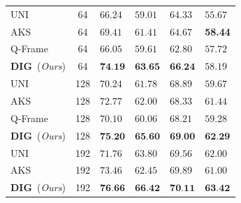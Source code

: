 \begin{table}[t]
\begin{minipage}{0.48\linewidth}
{\begin{tabular}{l|c|ZZZZ}
         UNI & 64 & $66.24$ & $59.01$ & $64.33$ & $55.67$ \\
         AKS~\cite{tang2025adaptivekeyframesamplinglong} & 64 & $69.41$ & $61.41$ & $64.67$ & \textbf{58.44} \\
         Q-Frame~\cite{zhang2025qframequeryawareframeselection} & 64 & $66.05$ & $59.61$ & $62.80$ & $57.72$ \\
         \textbf{DIG}~(\textit{Ours}) & 64 & $\textbf{74.19}$ & $\textbf{63.65}$ & $\textbf{66.24}$ & $58.19$ \\
         \midrule
         UNI & 128 & $70.24$ & $61.78$ & $68.89$ & $59.67$ \\
         AKS~\cite{tang2025adaptivekeyframesamplinglong} & 128 & $72.77$ & $62.00$ & $68.33$ & $61.44$ \\
         Q-Frame~\cite{zhang2025qframequeryawareframeselection} & 128 & $70.10$ & $60.06$ & $68.21$ & $59.28$ \\
         \textbf{DIG}~(\textit{Ours}) & 128 & $\textbf{75.20}$ & $\textbf{65.60}$ & $\textbf{69.00}$ & $\textbf{62.29}$ \\
         \midrule
         UNI & 192 & $71.76$ & $63.80$ & $69.56$ & $62.00$ \\
         AKS~\cite{tang2025adaptivekeyframesamplinglong} & 192 & $73.46$ & $62.45$ & $69.89$ & $61.00$ \\
         \textbf{DIG}~(\textit{Ours}) & 192 & $\textbf{76.66}$ & $\textbf{66.42}$ & $\textbf{70.11}$ & $\textbf{63.42}$ \\
         \bottomrule
      \end{tabular}
    }
  \end{minipage}
\end{table}
